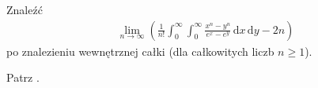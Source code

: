 %

\begin{problem_with_solution}
    \label{valean_1_38}%
    Znaleźć
    \begin{align}
        \lim_{n\to\infty} \left(\frac{1}{n!} \int_0^\infty \int_0^\infty \frac{x^n - y^n}{e^x - e^y} \,\mathrm{d}x \,\mathrm{d}y - 2n\right)
    \end{align} 
    po znalezieniu wewnętrznej całki (dla całkowitych liczb $n \ge 1$).
\end{problem_with_solution}

\begin{solution}
    Patrz \cite[s. ?????]{valean19}.
\end{solution}

%